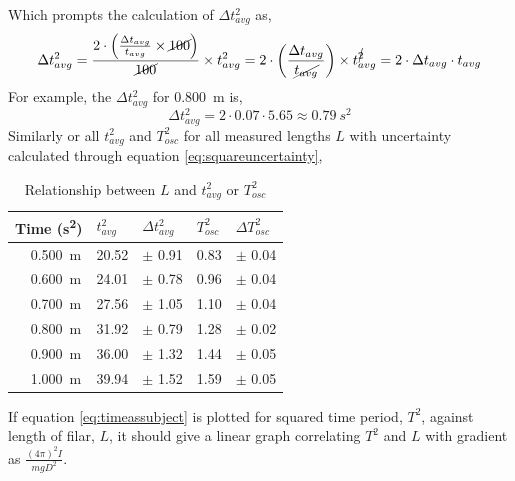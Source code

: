 \documentclass[a4paper,12pt]{article}
\theoremstyle{definition}
\begin{document}
Which prompts the calculation of $\Delta t_{avg}^{2}$ as,
\begin{equation}
	\Delta t_{avg}^{2}=\frac{2 \cdot \left( \frac{\Delta t_{avg}}{t_{avg}}\times \cancel{100} \right) }{\cancel{100}}\times t_{avg}^2 ={2 \cdot \left( \frac{\Delta t_{avg}}{\cancel{t_{avg}}} \right) } \times t^{\cancel{2}}_{avg} = 2\cdot \Delta t_{avg}\cdot t_{avg}
\end{equation}\label{eq:squareuncertainty}
For example, the $\Delta t_{avg}^2$ for \SI{0.800}{m} is,
\begin{equation*}
	\Delta t^2_{avg} = 2 \cdot 0.07 \cdot 5.65  \approx \SI{0.79}{s^2}
\end{equation*}
Similarly or all $t^2_{avg}$ and $T^2_{osc}$ for all measured lengths $L$ with uncertainty calculated through equation \ref{eq:squareuncertainty},
\begin{table}[H]
\begin{center}
\begin{tabular}{l||c|ll|ll} \toprule
\multicolumn{2}{l||}{Time (\si{s^2}) }   &  $t_{avg}^2$ & $\Delta t_{avg}^2$  & $T_{osc}^2$ & $\Delta T_{osc}^2$\\ \midrule
\parbox[t]{2mm}{} 
								   & \SI{0.500}{m}     &  20.52 & $\pm$ 0.91 & 0.83&$\pm$ 0.04\\
                                   & \SI{0.600}{m}    &  24.01 &$\pm$ 0.78 & 0.96&$\pm$ 0.04\\
                                   & \SI{0.700}{m}    &    27.56 &$\pm$ 1.05 & 1.10&$\pm$ 0.04 \\
                                   & \SI{0.800}{m}     &   31.92 &$\pm$ 0.79 &1.28 &$\pm$ 0.02\\
                                   	& \SI{0.900}{m}     &   36.00 &$\pm$  1.32 &1.44 &$\pm$ 0.05\\
                                   		& \SI{1.000}{m}     &   39.94 &$\pm$  1.52 &1.59 &$\pm$ 0.05\\
                       
\bottomrule
\end{tabular}
\end{center}
\caption{Relationship between $L$ and $t^2_{avg}$ or $T^2_{osc}$}
\label{tab:processeddatasquare}
\end{table}

If equation \ref{eq:timeassubject} is plotted for squared time period, $T^2$, against length of filar, $L$, it should give a linear graph correlating $T^2$ and $L$ with gradient as $\frac{(4 \pi)^2 I}{mgD^2}$.
\end{document}
